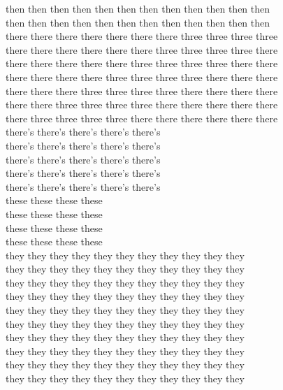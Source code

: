 then then then then then then then then then then then then\\
then then then then then then then then then then then then\\
there there there there there there there three three three three\\
there there there there there there three three three three there\\
there there there there there three three three three there there\\
there there there there three three three three there there there\\
there there there three three three three there there there there\\
there there three three three three there there there there there\\
there three three three three there there there there there there\\
there's there's there's there's there's\\
there's there's there's there's there's\\
there's there's there's there's there's\\
there's there's there's there's there's\\
there's there's there's there's there's\\
these these these these\\
these these these these\\
these these these these\\
these these these these\\
they they they they they they they they they they they\\
they they they they they they they they they they they\\
they they they they they they they they they they they\\
they they they they they they they they they they they\\
they they they they they they they they they they they\\
they they they they they they they they they they they\\
they they they they they they they they they they they\\
they they they they they they they they they they they\\
they they they they they they they they they they they\\
they they they they they they they they they they they\\
